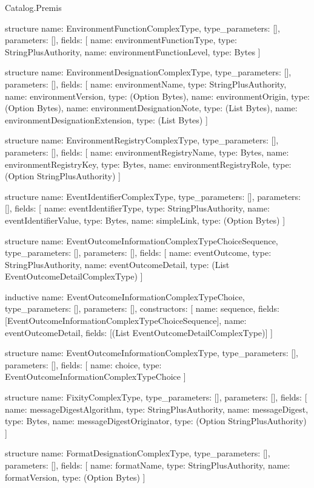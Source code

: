 \begin{lexlean}{Catalog.Premis}
\begin{semanticmodule}
structure{
  name: EnvironmentFunctionComplexType,
  type_parameters: [],
  parameters: [],
  fields: [
    {name: environmentFunctionType, type: StringPlusAuthority},
    {name: environmentFunctionLevel, type: Bytes}
  ]
}

structure{
  name: EnvironmentDesignationComplexType,
  type_parameters: [],
  parameters: [],
  fields: [
    {name: environmentName, type: StringPlusAuthority},
    {name: environmentVersion, type: (Option Bytes)},
    {name: environmentOrigin, type: (Option Bytes)},
    {name: environmentDesignationNote, type: (List Bytes)},
    {name: environmentDesignationExtension, type: (List Bytes)}
  ]
}

structure{
  name: EnvironmentRegistryComplexType,
  type_parameters: [],
  parameters: [],
  fields: [
    {name: environmentRegistryName, type: Bytes},
    {name: environmentRegistryKey, type: Bytes},
    {name: environmentRegistryRole, type: (Option StringPlusAuthority)}
  ]
}

structure{
  name: EventIdentifierComplexType,
  type_parameters: [],
  parameters: [],
  fields: [
    {name: eventIdentifierType, type: StringPlusAuthority},
    {name: eventIdentifierValue, type: Bytes},
    {name: simpleLink, type: (Option Bytes)}
  ]
}

structure{
  name: EventOutcomeInformationComplexTypeChoiceSequence,
  type_parameters: [],
  parameters: [],
  fields: [
    {name: eventOutcome, type: StringPlusAuthority},
    {name: eventOutcomeDetail, type: (List EventOutcomeDetailComplexType)}
  ]
}

inductive{
  name: EventOutcomeInformationComplexTypeChoice,
  type_parameters: [],
  parameters: [],
  constructors: [
    {name: sequence, fields: [EventOutcomeInformationComplexTypeChoiceSequence]},
    {name: eventOutcomeDetail, fields: [(List EventOutcomeDetailComplexType)]}
  ]
}

structure{
  name: EventOutcomeInformationComplexType,
  type_parameters: [],
  parameters: [],
  fields: [
    {name: choice, type: EventOutcomeInformationComplexTypeChoice}
  ]
}

structure{
  name: FixityComplexType,
  type_parameters: [],
  parameters: [],
  fields: [
    {name: messageDigestAlgorithm, type: StringPlusAuthority},
    {name: messageDigest, type: Bytes},
    {name: messageDigestOriginator, type: (Option StringPlusAuthority)}
  ]
}

structure{
  name: FormatDesignationComplexType,
  type_parameters: [],
  parameters: [],
  fields: [
    {name: formatName, type: StringPlusAuthority},
    {name: formatVersion, type: (Option Bytes)}
  ]
}


\end{semanticmodule}
\end{lexlean}
